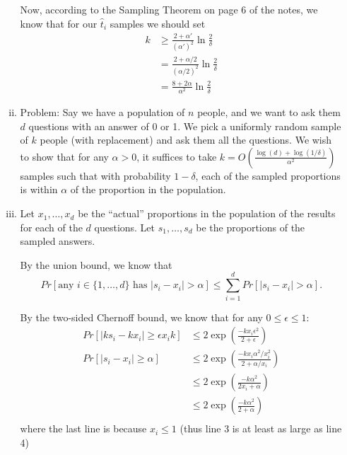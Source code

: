 \documentclass{article}
\newcommand{\sampavg}{\hat{t}}
\newcommand{\abs}[1]{\vert #1 \vert}
\begin{document}
\begin{enumerate}[(a)]
\begin{enumerate}[(i)]
                Now, according to the Sampling Theorem on page 6 of the notes, we know that for our $\sampavg_i$ samples
                we should set 
                \begin{align*}
                    k &\ge \frac{2+\alpha'}{(\alpha')^2} \ln \frac{2}{\delta} \\
                    &= \frac{2 + \alpha/2}{(\alpha/2)^2} \ln \frac{2}{\delta} \\
                    &= \frac{8 + 2\alpha}{\alpha^2} \ln \frac{2}{\delta}
                \end{align*}
            \item Problem: Say we have a population of $n$ people, and we want to ask them $d$ questions with an answer
                of 0 or 1.  We pick a uniformly random sample of $k$ people (with replacement) and ask them all the
                questions.  We wish to show that for any $\alpha > 0$, it suffices to take $k = O(\frac{\log(d) +
                \log(1/\delta)}{\alpha^2})$ samples such that with probability $1-\delta$, each of the sampled
                proportions is within $\alpha$ of the proportion in the population.
                
            \item Let $x_1, \ldots, x_d$ be the ``actual'' proportions in the population of the results for
                each of the $d$ questions.  Let $s_1, \ldots, s_d$ be the proportions of the sampled answers.

                By the union bound, we know that 
                \[Pr[\text{any }i \in \{1,\ldots,d\}\text{ has }\abs{s_i - x_i} >
                \alpha] \le \sum_{i=1}^d Pr[\abs{s_i - x_i} > \alpha].\]
                
                By the two-sided Chernoff bound, we know that for any $0 \le \epsilon \le 1$: 
                \begin{align*} 
                    Pr[\abs{ k s_i - k x_i } \ge \epsilon x_i k] &\le 2\exp\left(\frac{-kx_i\epsilon^2}{2+\epsilon}\right) \\
                    Pr[\abs{ s_i - x_i} \ge \alpha] &\le 2\exp\left( \frac{-kx_i\alpha^2/x_i^2}{2+\alpha/x_i} \right) \\
                    &\le 2\exp\left( \frac{-k\alpha^2}{2x_i + \alpha} \right) \\
                    &\le 2\exp\left( \frac{-k\alpha^2}{2 + \alpha} \right) \\
                \end{align*}
                where the last line is because $x_i \le 1$ (thus line 3 is at least as large as line 4)


\end{enumerate}
\end{enumerate}
\end{document}
